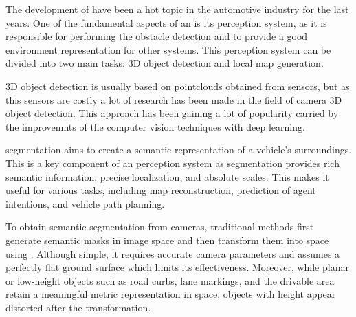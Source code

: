 
The development of  have been a hot topic in the automotive industry for the last years. One of the fundamental aspects of an  is its perception system, as it is responsible for performing the obstacle detection and to provide a good environment representation for other systems. This perception system can be divided into two main tasks: 3D object detection and local  map generation. 

3D object detection is usually based on pointclouds obtained from  sensors, but as this sensors are costly a lot of research has been made in the field of camera 3D object detection. This approach has been gaining a lot of popularity carried by the improvemnts of the computer vision techniques with deep learning.

 segmentation aims to create a semantic representation of a vehicle's surroundings. This is a key component of an  perception system as  segmentation provides rich semantic information, precise localization, and absolute scales. This makes it useful for various tasks, including map reconstruction, prediction of agent intentions, and vehicle path planning.

To obtain  semantic segmentation from cameras, traditional methods first generate semantic masks in image space and then transform them into  space using . Although simple, it requires accurate camera parameters and assumes a perfectly flat ground surface which limits its effectiveness. Moreover, while planar or low-height objects such as road curbs, lane markings, and the drivable area retain a meaningful metric representation in  space, objects with height appear distorted after the transformation.


